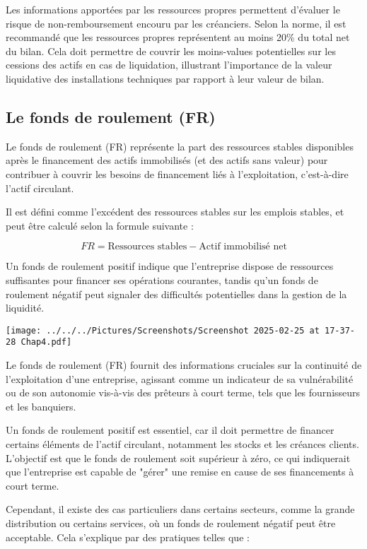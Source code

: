 \documentclass[a4paper, 12pt]{report}
\begin{document}
Les informations apportées par les ressources propres permettent d'évaluer le risque de non-remboursement encouru par les créanciers. Selon la norme, il est recommandé que les ressources propres représentent au moins 20\% du total net du bilan. Cela doit permettre de couvrir les moins-values potentielles sur les cessions des actifs en cas de liquidation, illustrant l'importance de la valeur liquidative des installations techniques par rapport à leur valeur de bilan.

\subsection{Le fonds de roulement (FR)}

Le fonds de roulement (FR) représente la part des ressources stables disponibles après le financement des actifs immobilisés (et des actifs sans valeur) pour contribuer à couvrir les besoins de financement liés à l'exploitation, c'est-à-dire l'actif circulant. 

Il est défini comme l'excédent des ressources stables sur les emplois stables, et peut être calculé selon la formule suivante :

\[
FR = \text{Ressources stables} - \text{Actif immobilisé net}
\]

Un fonds de roulement positif indique que l'entreprise dispose de ressources suffisantes pour financer ses opérations courantes, tandis qu'un fonds de roulement négatif peut signaler des difficultés potentielles dans la gestion de la liquidité.

\begin{center}
	\texttt{[image: ../../../Pictures/Screenshots/Screenshot 2025-02-25 at 17-37-28 Chap4.pdf]}
\end{center}

Le fonds de roulement (FR) fournit des informations cruciales sur la continuité de l'exploitation d'une entreprise, agissant comme un indicateur de sa vulnérabilité ou de son autonomie vis-à-vis des prêteurs à court terme, tels que les fournisseurs et les banquiers. 

Un fonds de roulement positif est essentiel, car il doit permettre de financer certains éléments de l'actif circulant, notamment les stocks et les créances clients. L'objectif est que le fonds de roulement soit supérieur à zéro, ce qui indiquerait que l'entreprise est capable de "gérer" une remise en cause de ses financements à court terme.

Cependant, il existe des cas particuliers dans certains secteurs, comme la grande distribution ou certains services, où un fonds de roulement négatif peut être acceptable. Cela s'explique par des pratiques telles que :
\end{document}
